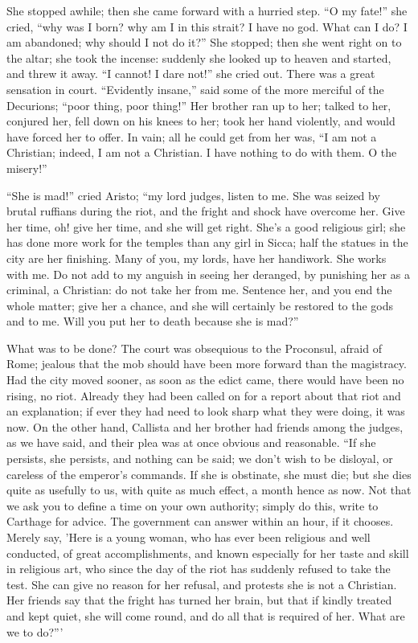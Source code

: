 She stopped awhile; then she came forward with a hurried step.
``O my fate!'' she cried, ``why was I born? why am I in
this strait? I have no god. What can I do? I am abandoned; why should
I not do it?'' She stopped; then she went right on to the altar;
she took the incense: suddenly she looked up to heaven and started,
and threw it away. ``I cannot! I dare not!'' she cried
out. There was a great sensation in court. ``Evidently
insane,'' said some of the more merciful of the Decurions;
``poor thing, poor thing!'' Her brother ran up to her; talked
to her, conjured her, fell down on his knees to her; took her hand
violently, and would have forced her to offer. In vain; all he could
get from her was, ``I am not a Christian; indeed, I am not a
Christian. I have nothing to do with them. O the misery!''

``She is mad!'' cried Aristo; ``my lord judges, listen
to me. She was seized by brutal ruffians during the riot, and the
fright and shock have overcome her. Give her time, oh! give her time,
and she will get right. She's a good religious girl; she has done more
work for the temples than any girl in Sicca; half the statues in the
city are her finishing. Many of you, my lords, have her handiwork. She
works with me. Do not add to my anguish in seeing her deranged, by
punishing her as a criminal, a Christian: do not take her from me.
Sentence her, and you end the whole matter; give her a chance, and she
will certainly be restored to the gods and to me. Will you put her to
death because she is mad?''

What was to be done? The court was obsequious to the Proconsul,
afraid of Rome; jealous that the mob should have been more forward
than the magistracy. Had the city moved sooner, as soon as the edict
came, there would have been no rising, no riot. Already they had been
called on for a report about that riot and an explanation; if ever
they had need to look sharp what they were doing, it was now. On
the other hand, Callista and her brother had friends among the judges,
as we have said, and their plea was at once obvious and reasonable.
``If she persists, she persists, and nothing can be said; we don't
wish to be disloyal, or careless of the emperor's commands. If she is
obstinate, she must die; but she dies quite as usefully to us, with
quite as much effect, a month hence as now. Not that we ask you to
define a time on your own authority; simply do this, write to Carthage
for advice. The government can answer within an hour, if it chooses.
Merely say, 'Here is a young woman, who has ever been religious and
well conducted, of great accomplishments, and known especially for her
taste and skill in religious art, who since the day of the riot has
suddenly refused to take the test. She can give no reason for her
refusal, and protests she is not a Christian. Her friends say that the
fright has turned her brain, but that if kindly treated and kept
quiet, she will come round, and do all that is required of her. What
are we to do?'''

